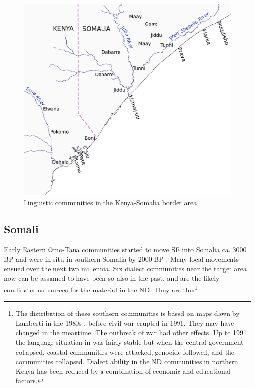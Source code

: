 \documentclass[output=paper
,newtxmath
,modfonts
,nonflat]{langsci/langscibook}
\begin{document}
\begin{figure}
\includegraphics[width=\textwidth]{figures/nurse.pdf}
\caption{Linguistic communities in the Kenya-Somalia border area}
\label{fig:nurse:1}
\end{figure}

\subsection{Somali}\label{sec:nurse:2.2} 

Early Eastern Omo-Tana communities started to move SE into Somalia ca. 3000 BP and were in situ in southern Somalia by 2000 BP \citep{ehret1995}. Many local movements ensued over the next two millennia. Six  dialect communities near the target area now can be assumed to have been so also in the past, and are the likely candidates as sources for the material in the ND. They are the:\footnote{The distribution of these southern  communities is based on maps dawn by Lamberti in the 1980s \citep{Lamberti1983}, before civil war erupted in 1991. They may have changed in the meantime. The outbreak of war had other effects. Up to 1991 the language situation in  was fairly stable but when the central government collapsed, coastal  communities were attacked, genocide followed, and the communities collapsed. Dialect ability in the ND communities in northern Kenya has been reduced by a combination of economic and educational factors.}
\end{document}
